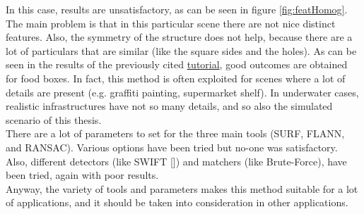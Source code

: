 \vspace{20px}
In this case, results are unsatisfactory, as can be seen in figure \ref{fig:featHomog}. The main problem is that in this particular scene there are not nice distinct features. Also, the symmetry of the structure does not help, because there are a lot of particulars that are similar (like the square sides and the holes). As can be seen in the results of the previously cited \href{https://docs.opencv.org/3.4/d7/dff/tutorial_feature_homography.html}{tutorial}, good outcomes are obtained for food boxes. In fact, this method is often exploited for scenes where a lot of details are present (e.g. graffiti painting, supermarket shelf). In underwater cases, realistic infrastructures have not so many details, and so also the simulated scenario of this thesis.\\

There are a lot of parameters to set for the three main tools (SURF, FLANN, and RANSAC). Various options have been tried but no-one was satisfactory. Also, different detectors (like SWIFT [\cite{loweTest}]) and matchers (like Brute-Force), have been tried, again with poor results.\\
Anyway, the variety of tools and parameters makes this method suitable for a lot of applications, and it should be taken into consideration in other applications.






